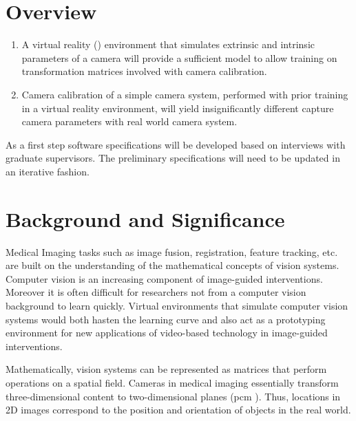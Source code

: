 \documentclass[11pt]{report}
\begin{document}
\section{Overview}


     
\begin{enumerate}
\item A virtual reality () environment that simulates extrinsic and intrinsic parameters of a camera will provide a sufficient model to allow training on transformation matrices involved with camera calibration.
\item Camera calibration of a simple camera system, performed with prior training in a virtual reality environment, will yield insignificantly different capture camera parameters with real world camera system. 
\end{enumerate}

As a first step software specifications will be developed based on interviews with graduate supervisors. The preliminary specifications will need to be updated in an iterative fashion. 

\section{Background and Significance}

Medical Imaging tasks such as image fusion, registration, feature tracking, etc. are built on the understanding of the mathematical concepts of vision systems. Computer vision is an increasing component of image-guided interventions. Moreover it is often difficult for researchers not from a computer vision background to learn quickly. Virtual environments that simulate computer vision systems would both hasten the learning curve and also act as a prototyping environment for new applications of video-based technology in image-guided interventions. 



Mathematically, vision systems can be represented as matrices that perform operations on a spatial field. Cameras in medical imaging essentially transform three-dimensional content to two-dimensional planes (\gls{pcm} \cite{CV}). Thus, locations in 2D images correspond to the position and orientation of objects in the real world.
\end{document}
